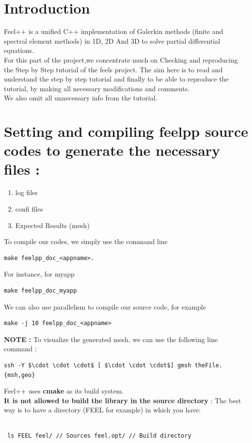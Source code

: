 \documentclass[11pt,utf8]{article}
\begin{document}
\section{Introduction}
Feel++ is a unified C++ implementation of Galerkin methods (finite and spectral element methods) in 1D, 2D And 3D to solve partial differential equations.\\
For this part of the project,we concentrate much on  Checking and reproducing the Step by Step tutorial of the feels project.
The aim here is to read and understand the step by step tutorial and finally to be able to reproduce the tutorial, by making all necessary modifications and comments.\\ 
We also omit all unnecessary info from the tutorial.


\section{\textbf{Setting and compiling feelpp source codes to generate the necessary  files :}}
\begin{enumerate}[i]
\item log files
\item confi files
\item Expected Results (mesh)
\end{enumerate}
To compile our codes, we simply use the command line 
 \begin{lstlisting}
make feelpp_doc_<appname>.
 \end{lstlisting}
For instance,  for myapp
 \begin{lstlisting}
make feelpp_doc_myapp
 \end{lstlisting}
 We can also use parallelism to compile our source code, for example 
\begin{lstlisting}
make -j 10 feelpp_doc_<appname>
\end{lstlisting}


\textbf{NOTE :} 
To visualize the generated mesh, we can use the following line command :
\begin{lstlisting}
ssh -Y $\cdot \cdot \cdot$ [ $\cdot \cdot \cdot$] gmsh theFile.{msh,geo}
\end{lstlisting}
Feel++ uses \textbf{cmake} as its build system.\\
\textbf{It is not allowed to build the library in the source directory} : The best way is to have a directory (FEEL for example) in which you have: 
 \begin{center}
 \begin{lstlisting}

 ls FEEL feel/ // Sources feel.opt/ // Build directory 
 \end{lstlisting}
 \end{center}
\end{document}
